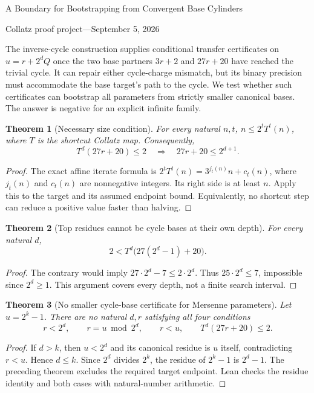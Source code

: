 \documentclass[11pt]{article}
\newtheorem{theorem}{Theorem}
\begin{document}
\begin{center}
{\Large A Boundary for Bootstrapping from Convergent Base Cylinders}\par\medskip
Collatz proof project\quad---\quad September 5, 2026
\end{center}
The inverse-cycle construction supplies conditional transfer certificates on
$u=r+2^dQ$ once the two base partners $3r+2$ and $27r+20$ have reached the
trivial cycle. It can repair either cycle-charge mismatch, but its binary
precision must accommodate the base target's path to the cycle.
We test whether such certificates can bootstrap all parameters from strictly
smaller canonical bases. The answer is negative for an explicit infinite family.

\begin{theorem}[Necessary size condition]
For every natural $n,t$, $n\leq2^tT^t(n)$, where $T$ is the shortcut
Collatz map. Consequently,
\[
 T^d(27r+20)\leq2\quad\Longrightarrow\quad27r+20\leq2^{d+1}.
\]
\end{theorem}
\begin{proof}
The exact affine iterate formula is
$2^tT^t(n)=3^{j_t(n)}n+c_t(n)$, where $j_t(n)$ and $c_t(n)$ are
nonnegative integers. Its right side is at least $n$.
Apply this to the target and its assumed endpoint bound.
Equivalently, no shortcut step can reduce a positive value faster than halving.
\end{proof}

\begin{theorem}[Top residues cannot be cycle bases at their own depth]
For every natural $d$,
\[
 2<T^d\bigl(27(2^d-1)+20\bigr).
\]
\end{theorem}
\begin{proof}
The contrary would imply $27\cdot2^d-7\leq2\cdot2^d$.
Thus $25\cdot2^d\leq7$, impossible since $2^d\geq1$.
This argument covers every depth, not a finite search interval.
\end{proof}

\begin{theorem}[No smaller cycle-base certificate for Mersenne parameters]
Let $u=2^k-1$. There are no natural $d,r$ satisfying all four conditions
\[
 r<2^d,\qquad r=u\bmod2^d,\qquad r<u,\qquad
 T^d(27r+20)\leq2.
\]
\end{theorem}
\begin{proof}
If $d>k$, then $u<2^d$ and its canonical residue is $u$ itself,
contradicting $r<u$. Hence $d\leq k$.
Since $2^d$ divides $2^k$, the residue of $2^k-1$ is $2^d-1$.
The preceding theorem excludes the required target endpoint.
Lean checks the residue identity and both cases with natural-number arithmetic.
\end{proof}
\end{document}
